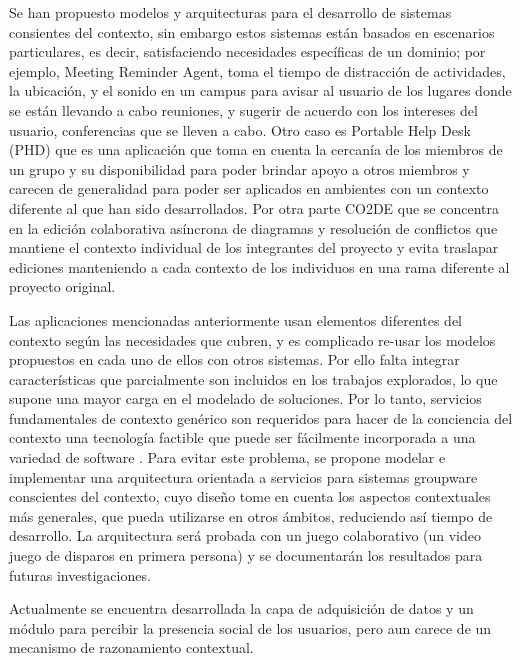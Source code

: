 Se han propuesto modelos y arquitecturas para el desarrollo de sistemas consientes del contexto, sin embargo estos sistemas est\'an basados en escenarios particulares, es decir, satisfaciendo necesidades espec\'ificas de un dominio; por ejemplo, Meeting Reminder Agent\citep{anhalt2001toward}, toma el tiempo de distracci\'on de actividades, la ubicaci\'on, y el sonido en un campus para avisar al usuario de los lugares donde se est\'an llevando a cabo reuniones, y sugerir de acuerdo con los intereses del usuario, conferencias que se lleven a cabo. Otro caso es Portable Help Desk (PHD) \citep{anhalt2001toward} que es una aplicaci\'on que toma en cuenta la cercan\'ia de los miembros de un grupo y su disponibilidad para poder brindar apoyo a otros miembros y carecen de generalidad para poder ser aplicados en ambientes con un contexto diferente al que han sido desarrollados. Por otra parte CO2DE \citep{schmidt1992taking} que se concentra en la edici\'on colaborativa as\'incrona de diagramas y resoluci\'on de conflictos que mantiene el contexto individual de los integrantes del proyecto y evita traslapar ediciones manteniendo a cada contexto de los individuos en una rama diferente al proyecto original.

Las aplicaciones mencionadas anteriormente usan elementos diferentes del contexto seg\'un las necesidades que cubren, y es complicado re-usar los modelos propuestos en cada uno de ellos con otros sistemas. Por ello falta integrar caracter\'isticas que parcialmente son incluidos en los trabajos explorados, lo que supone una mayor carga en el modelado de soluciones. Por lo tanto, servicios fundamentales de contexto gen\'erico son requeridos para hacer de la conciencia del contexto una tecnolog\'ia factible que puede ser f\'acilmente incorporada a una variedad de software \citep{pascoe1999}. Para evitar este problema, se propone modelar e implementar una arquitectura orientada a servicios para sistemas groupware conscientes del contexto, cuyo dise\~no tome en cuenta los aspectos contextuales m\'as generales, que pueda utilizarse en otros \'ambitos, reduciendo as\'i tiempo de desarrollo. La arquitectura ser\'a probada con un juego colaborativo (un video juego de disparos en primera persona) y se documentar\'an los resultados para futuras investigaciones.
 
Actualmente se encuentra desarrollada la capa de adquisici\'on de datos y un m\'odulo para percibir la presencia social de los usuarios, pero aun carece de un mecanismo de razonamiento contextual.
